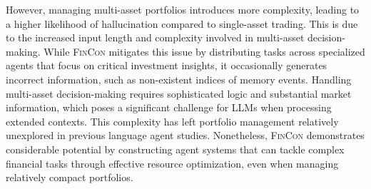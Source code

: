 However, managing multi-asset portfolios introduces more complexity, leading to a higher likelihood of hallucination compared to single-asset trading. This is due to the increased input length and complexity involved in multi-asset decision-making. While \textsc{FinCon} mitigates this issue by distributing tasks across specialized agents that focus on critical investment insights, it occasionally generates incorrect information, such as non-existent indices of memory events. Handling multi-asset decision-making requires sophisticated logic and substantial market information, which poses a significant challenge for LLMs when processing extended contexts. This complexity has left portfolio management relatively unexplored in previous language agent studies. Nonetheless, \textsc{FinCon} demonstrates considerable potential by constructing agent systems that can tackle complex financial tasks through effective resource optimization, even when managing relatively compact portfolios.

